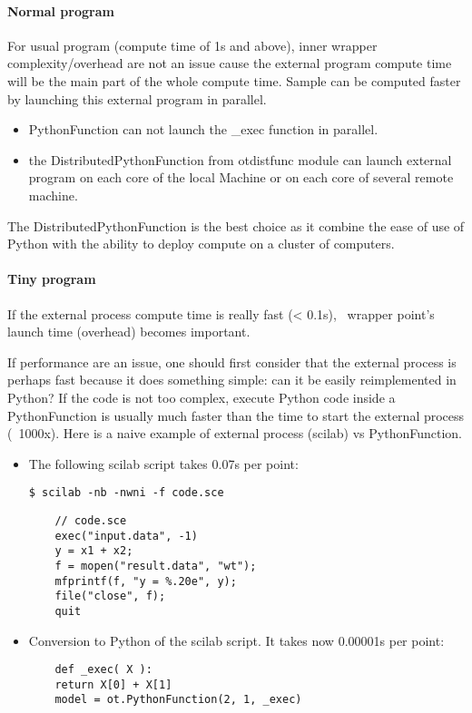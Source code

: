 \paragraph{Normal program}

For usual program (compute time of 1s and above), inner wrapper complexity/overhead are not an issue cause the external program compute time will be the main part of the whole compute time. Sample can be computed faster by launching this external program in parallel.

\begin{itemize}
\item PythonFunction can not launch the \_exec function in parallel.
\item the DistributedPythonFunction from otdistfunc module can launch external program on each core of the local Machine or on each core of several remote machine.
\end{itemize}

The DistributedPythonFunction is the best choice as it combine the ease of use of Python with the ability to deploy compute on a cluster of computers.



\paragraph{Tiny program}

If the external process compute time is really fast (< 0.1s), \OT\ wrapper point's launch time (overhead) becomes important.

If performance are an issue, one should first consider that the external process is perhaps fast because it does something simple: can it be easily reimplemented in Python? If the code is not too complex, execute Python code inside a PythonFunction is usually much faster than the time to start the external process (~1000x). Here is a naive example of external process (scilab) vs PythonFunction.

\begin{itemize}
\item The following scilab script takes 0.07s per point:

  \verb|$ scilab -nb -nwni -f code.sce|

  \begin{lstlisting}
    // code.sce
    exec("input.data", -1)
    y = x1 + x2;
    f = mopen("result.data", "wt");
    mfprintf(f, "y = %.20e", y);
    file("close", f);
    quit
  \end{lstlisting}


\item Conversion to Python of the scilab script. It takes now 0.00001s per point:

  \begin{lstlisting}
    def _exec( X ):
    return X[0] + X[1]
    model = ot.PythonFunction(2, 1, _exec)
  \end{lstlisting}
\end{itemize}

